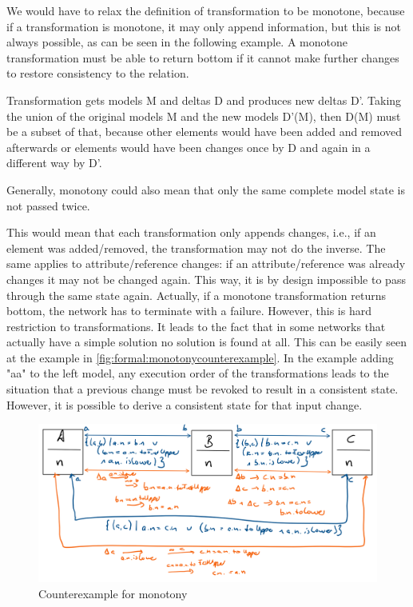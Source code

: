 We would have to relax the definition of transformation to be monotone, because if a transformation is monotone, it may only append information, but this is not always possible, as can be seen in the following example. A monotone transformation must be able to return bottom if it cannot make further changes to restore consistency to the relation.

\begin{definition}
    Transformation gets models M and deltas D and produces new deltas D'. Taking the union of the original models M and the new models D'(M), then D(M) must be a subset of that, because other elements would have been added and removed afterwards or elements would have been changes once by D and again in a different way by D'.

    Generally, monotony could also mean that only the same complete model state is not passed twice. 
\end{definition}

This would mean that each transformation only appends changes, i.e., if an element was added/removed, the transformation may not do the inverse. The same applies to attribute/reference changes: if an attribute/reference was already changes it may not be changed again.
This way, it is by design impossible to pass through the same state again. Actually, if a monotone transformation returns bottom, the network has to terminate with a failure.
However, this is hard restriction to transformations. It leads to the fact that in some networks that actually have a simple solution no solution is found at all. This can be easily seen at the example in \autoref{fig:formal:monotonycounterexample}. In the example adding "aa" to the left model, any execution order of the transformations leads to the situation that a previous change must be revoked to result in a consistent state. However, it is possible to derive a consistent state for that input change.

\begin{figure}
    \centering
    \includegraphics[width=\textwidth]{figures/correctness/orchestration/monotony_counterexample.png}
    \caption{Counterexample for monotony}
    \label{fig:formal:monotonycounterexample}
\end{figure}


